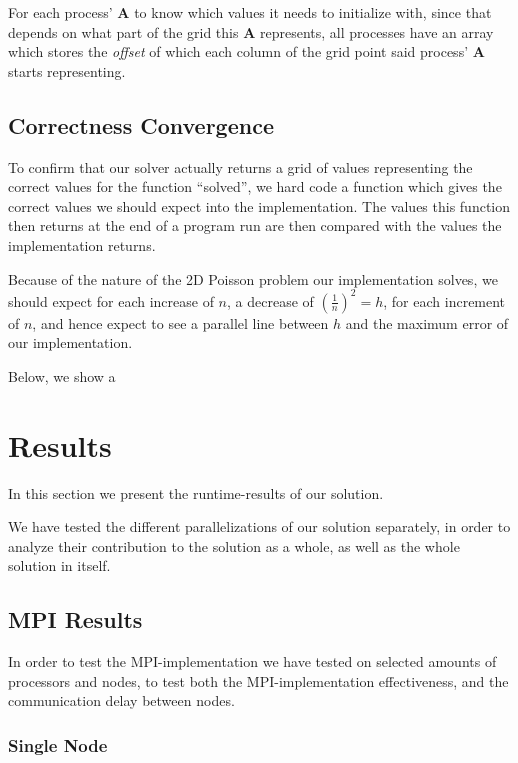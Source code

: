 \documentclass[fontsize=11pt,paper=a4,titlepage]{article}
\begin{document}
For each process' $\mathbf{A}$ to know which values it needs to initialize with,
since that depends on what part of the grid this $\mathbf{A}$ represents, all
processes have an array which stores the \textit{offset} of which each column of
the grid point said process' $\mathbf{A}$ starts representing.

\subsection{Correctness Convergence}

To confirm that our solver actually returns a grid of values representing the
correct values for the function ``solved'', we hard code a function which gives
the correct values we should expect into the implementation. The values this
function then returns at the end of a program run are then compared with the
values the implementation returns.

Because of the nature of the 2D Poisson problem our implementation solves, we
should expect for each increase of $n$, a decrease of $(\frac{1}{n})^2 = h$,
for each increment of $n$, and hence expect to see a parallel line between $h$
and the maximum error of our implementation.

Below, we show a


\section{Results}

In this section we present the runtime-results of our solution.

We have tested the different parallelizations of our solution separately, in
order to analyze their contribution to the solution as a whole, as well as the
whole solution in itself.

\subsection{MPI Results}

In order to test the MPI-implementation we have tested on selected amounts of
processors and nodes, to test both the MPI-implementation effectiveness, and the
communication delay between nodes.

\subsubsection{Single Node}
\end{document}
